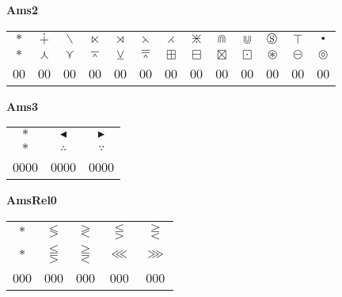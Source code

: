 \documentclass[12pt]{report}
\newlength{\mine}
\newlength{\niz}
\def\pmb{}
\begin{document}
\textbf{Ams2}
\par\nobreak\vspace{2mm}
\begin{tabular}{|c|cccccccccccc|}
  \hline
   $\pmb *$&
   $\pmb\dotplus $&
   $\pmb\smallsetminus $&
   $\pmb\ltimes $&
   $\pmb\rtimes $&
   $\pmb\leftthreetimes $&
   $\pmb\rightthreetimes $&
   $\pmb\divideontimes $&
   $\pmb\Cap $&
   $\pmb\Cup $&
   $\pmb\circledS $&
   $\pmb\intercal $&
   $\pmb\centerdot $\\[\mine]
   $\pmb *$&
   $\pmb\curlywedge $&
   $\pmb\curlyvee $&
   $\pmb\barwedge $&
   $\pmb\veebar $&
   $\pmb\doublebarwedge $&
   $\pmb\boxplus $&
   $\pmb\boxminus $&
   $\pmb\boxtimes $&
   $\pmb\boxdot $&
   $\pmb\circledast $&
   $\pmb\circleddash $&
   $\pmb\circledcirc $\\[\niz]
  \hline\hline
  00&00&00&00&00&00&00&00&00&00&00&00&00\\
  \hline
\end{tabular}
\goodbreak\par\vspace{3mm}

\textbf{Ams3}
\par\nobreak\vspace{2mm}
\begin{tabular}{|c|cc|}
  \hline
   $\pmb *$&
   $\pmb\blacktriangleleft $&
   $\pmb\blacktriangleright $\\[\mine]
   $\pmb *$&
   $\pmb\therefore $&
   $\pmb\because $\\[\niz]
  \hline\hline
  0000&0000&0000\\
  \hline
\end{tabular}
\goodbreak\par\vspace{3mm}

\newpage

\textbf{AmsRel0}
\par\nobreak\vspace{2mm}
\begin{tabular}{|c|cccc|}
  \hline
   $\pmb *$&
   $\pmb\lessgtr $&
   $\pmb\gtrless $&
   $\pmb\lesseqgtr $&
   $\pmb\gtreqless $\\[\mine]
   $\pmb *$&
   $\pmb\lesseqqgtr $&
   $\pmb\gtreqqless $&
   $\pmb\lll $&
   $\pmb\ggg $\\[\niz]
  \hline\hline
  000&000&000&000&000\\
  \hline
\end{tabular}
\goodbreak\par\vspace{3mm}
\end{document}
